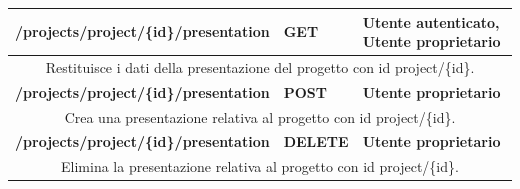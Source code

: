 \begin{table}[H]
	\begin{tabular}{|p{}|p{}|p{}|}
		\toprule
		\textbf{/projects/project/\{id\}/presentation} & \textbf{GET} & \textbf{Utente autenticato, Utente proprietario} \\ \midrule
		\multicolumn{3}{|c|}{Restituisce i dati della presentazione del progetto con id project/\{id\}.} \\
		\bottomrule
		\textbf{/projects/project/\{id\}/presentation} & \textbf{POST} & \textbf{Utente proprietario} \\ \midrule
		\multicolumn{3}{|c|}{Crea una presentazione relativa al progetto con id project/\{id\}.} \\
		\bottomrule
		\textbf{/projects/project/\{id\}/presentation} & \textbf{DELETE} & \textbf{Utente proprietario} \\ \midrule
		\multicolumn{3}{|c|}{Elimina la presentazione relativa al progetto con id project/\{id\}.} \\
		\bottomrule
	\end{tabular}\\
	\par\bigskip
	

\end{table}
